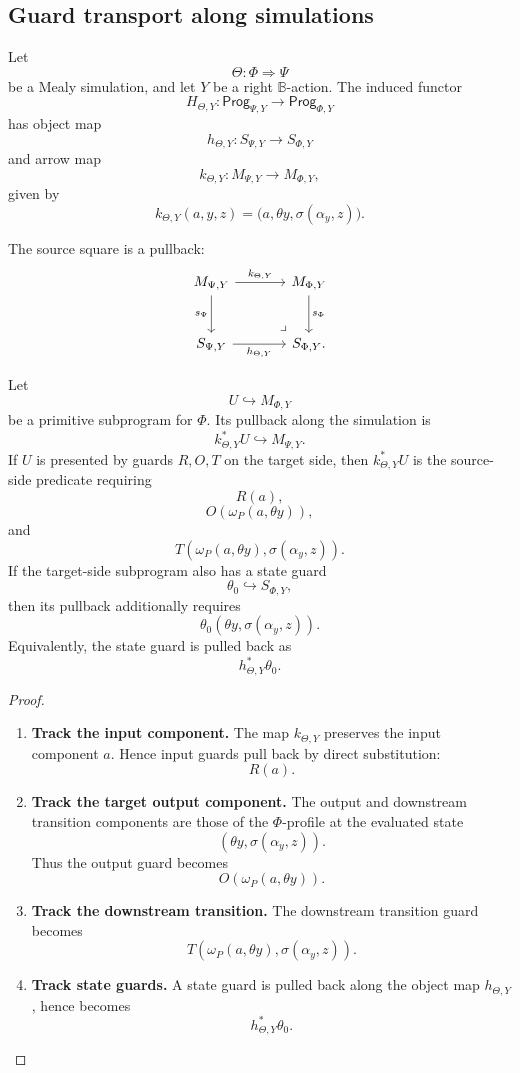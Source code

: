 \subsection{Guard transport along simulations}
\label{subsec:poly-relative-guard-transport-simulation}

Let
\[
\Theta:\Phi\Rightarrow\Psi
\]
be a Mealy simulation, and let \(Y\) be a right \(\mathbb B\)-action.  The
induced functor
\[
H_{\Theta,Y}:
\mathsf{Prog}_{\Psi,Y}\to\mathsf{Prog}_{\Phi,Y}
\]
has object map
\[
h_{\Theta,Y}:S_{\Psi,Y}\to S_{\Phi,Y}
\]
and arrow map
\[
k_{\Theta,Y}:M_{\Psi,Y}\to M_{\Phi,Y},
\]
given by
\[
k_{\Theta,Y}(a,y,z)
=
\bigl(a,\theta y,\sigma(\alpha_y,z)\bigr).
\]

The source square is a pullback:
\[
\begin{tikzcd}[column sep=large,row sep=large]
M_{\Psi,Y}
  \arrow[r,"k_{\Theta,Y}"]
  \arrow[d,"s_\Psi"']
&
M_{\Phi,Y}
  \arrow[d,"s_\Phi"]
\\
S_{\Psi,Y}
  \arrow[r,"h_{\Theta,Y}"']
&
S_{\Phi,Y}
\arrow[ul,phantom,very near start,"\lrcorner"] .
\end{tikzcd}
\]

\begin{proposition}
\label{prop:poly-relative-guard-transport-simulation}
Let
\[
U\hookrightarrow M_{\Phi,Y}
\]
be a primitive subprogram for \(\Phi\).  Its pullback along the simulation is
\[
k_{\Theta,Y}^\ast U\hookrightarrow M_{\Psi,Y}.
\]
If \(U\) is presented by guards \(R,O,T\) on the target side, then
\(k_{\Theta,Y}^\ast U\) is the source-side predicate requiring
\[
R(a),
\]
\[
O(\omega_P(a,\theta y)),
\]
and
\[
T(\omega_P(a,\theta y),\sigma(\alpha_y,z)).
\]
If the target-side subprogram also has a state guard
\[
\theta_0\hookrightarrow S_{\Phi,Y},
\]
then its pullback additionally requires
\[
\theta_0(\theta y,\sigma(\alpha_y,z)).
\]
Equivalently, the state guard is pulled back as
\[
h_{\Theta,Y}^{\ast}\theta_0.
\]
\end{proposition}

\begin{proof}
\leavevmode
\begin{enumerate}
\item \textbf{Track the input component.}
The map \(k_{\Theta,Y}\) preserves the input component \(a\).  Hence input
guards pull back by direct substitution:
\[
R(a).
\]

\item \textbf{Track the target output component.}
The output and downstream transition components are those of the
\(\Phi\)-profile at the evaluated state
\[
(\theta y,\sigma(\alpha_y,z)).
\]
Thus the output guard becomes
\[
O(\omega_P(a,\theta y)).
\]

\item \textbf{Track the downstream transition.}
The downstream transition guard becomes
\[
T(\omega_P(a,\theta y),\sigma(\alpha_y,z)).
\]

\item \textbf{Track state guards.}
A state guard is pulled back along the object map \(h_{\Theta,Y}\), hence
becomes
\[
h_{\Theta,Y}^{\ast}\theta_0.
\]
\end{enumerate}
\end{proof}

